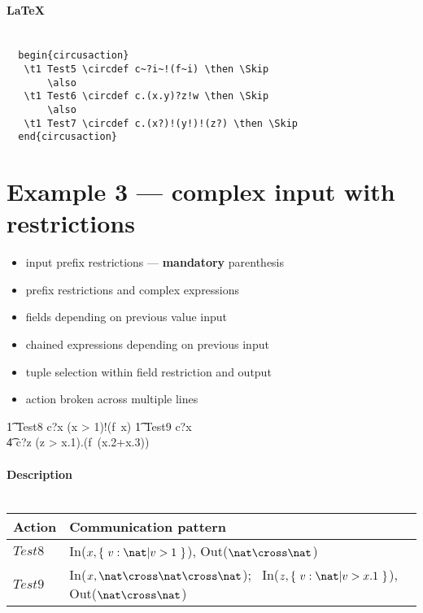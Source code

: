 \documentclass{article}
\begin{document}
\paragraph{\LaTeX\\ \\}

\begin{verbatim}
  begin{circusaction}
   \t1 Test5 \circdef c~?i~!(f~i) \then \Skip
       \also
   \t1 Test6 \circdef c.(x.y)?z!w \then \Skip
       \also
   \t1 Test7 \circdef c.(x?)!(y!)!(z?) \then \Skip
  end{circusaction}
\end{verbatim}

\newpage
\section{Example 3 --- complex input with restrictions}

\begin{itemize}
   \item input prefix restrictions --- \textbf{mandatory} parenthesis
   \item prefix restrictions and complex expressions
   \item fields depending on previous value input
   \item chained expressions depending on previous input
   \item tuple selection within field restriction and output
   \item action broken across multiple lines
\end{itemize}

\begin{circusaction}
   \t1 Test8 \circdef c?x \prefixcolon (x > 1)!(f~x) \then \Skip
    \also
   \t1 Test9 \circdef c?x \then \\
                  \t4 c?z \prefixcolon (z > x.1).(f~(x.2+x.3)) \then \Skip
\end{circusaction}

\paragraph{Description \\ \\}

\vspace{2pt}
\begin{tabular}{l|l}
   \hline
   Action   & Communication pattern \\
   \hline
   $Test8$  & In($x, \{~ v: \nat | v > 1 ~\}$), Out($\nat \cross \nat$) \\
   \hline
   $Test9$  & In($x, \nat \cross \nat \cross \nat$);~ In($z, \{~ v: \nat | v > x.1 ~\}$), Out($\nat \cross \nat$) \\
   \hline
\end{tabular}
\\
\end{document}
